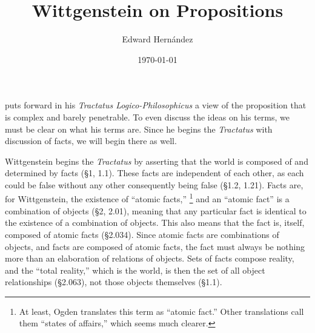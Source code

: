 \documentclass[12pt]{apa}
\begin{document}
\title{Wittgenstein on Propositions}
\author{Edward Hern\'{a}ndez}
\date{\today}

\maketitle






  puts forward in his \emph{Tractatus Logico-Philosophicus} a view of the proposition that is complex and barely penetrable. To even discuss the ideas on his terms, we must be clear on what his terms are. Since he begins the \emph{Tractatus} with discussion of facts, we will begin there as well.

 Wittgenstein begins the \emph{Tractatus} by asserting that the world is composed of and determined by facts (\S 1, 1.1). These facts are independent of each other, as each could be false without any other consequently being false (\S 1.2, 1.21). Facts are, for Wittgenstein, the existence of “atomic facts,” \footnote{At least, Ogden translates this term as ``atomic fact.'' Other translations call them ``states of affairs,'' which seems much clearer.} and an ``atomic fact''  is a combination of objects (\S 2, 2.01), meaning that any particular fact is identical to the existence of a combination of objects.  This also means that the fact is, itself, composed of atomic facts (\S 2.034). Since atomic facts are combinations of objects, and facts are composed of atomic facts, the fact must always be nothing more than an elaboration of relations of objects. Sets of facts compose reality, and the ``total reality,'' which is the world, is then the set of all object relationships (\S 2.063), not those objects themselves (\S 1.1).
\end{document}
